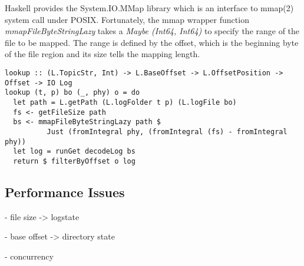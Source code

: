 Haskell provides the System.IO.MMap library which is an interface to mmap(2)
system call under POSIX. Fortunately, the mmap wrapper function
\textit{mmapFileByteStringLazy} takes a \textit{Maybe (Int64, Int64)} to specify
the range of the file to be mapped.  The range is defined by the offset, which
is the beginning byte of the file region and its size tells the mapping length.

\begin{lstlisting}
lookup :: (L.TopicStr, Int) -> L.BaseOffset -> L.OffsetPosition -> Offset -> IO Log
lookup (t, p) bo (_, phy) o = do
  let path = L.getPath (L.logFolder t p) (L.logFile bo)
  fs <- getFileSize path
  bs <- mmapFileByteStringLazy path $ 
          Just (fromIntegral phy, (fromIntegral (fs) - fromIntegral phy))
  let log = runGet decodeLog bs
  return $ filterByOffset o log
\end{lstlisting}

\subsection{Performance Issues}
\label{subsec:broker-log-performance-issues}

- file size -> logstate

- base offset -> directory state

- concurrency

